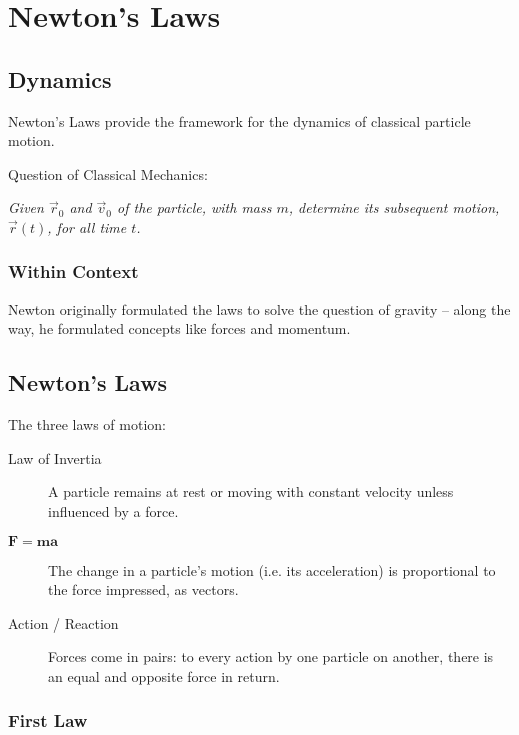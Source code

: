 \chapter{Newton's Laws}

\section{Dynamics}

Newton's Laws provide the framework for the dynamics of classical particle motion.

Question of Classical Mechanics:

\begin{center}
	\textit{Given $\vec r_0$ and $\vec v_0$ of the particle, with mass $m$, determine its subsequent motion, $\vec r(t)$, for all time $t$.}
\end{center}

\subsection{Within Context}

Newton originally formulated the laws to solve the question of gravity -- along the way, he formulated concepts like forces and momentum.

\section{Newton's Laws}

\begin{definition}
	The three laws of motion:

	\begin{description}
		\item[Law of Invertia] A particle remains at rest or moving with constant velocity unless influenced by a force.
		\item[$\mathbf{F = m a}$] The change in a particle's motion (i.e. its acceleration) is proportional to the force impressed, as vectors. 
		\item[Action / Reaction] Forces come in pairs: to every action by one particle on another, there is an equal and opposite force in return. 
	\end{description}
\end{definition}

\subsection{First Law}

